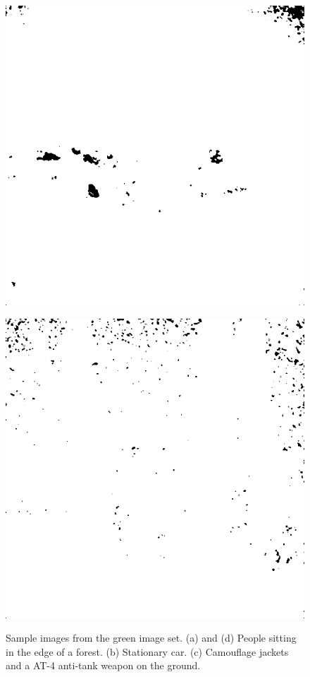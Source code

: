 \begin{figure}[H]
\begin{minipage}[t]{0.245\textwidth}
    \subcaption{}
    \label{fig:good2}
\end{minipage}
\begin{minipage}[t]{0.245\textwidth}
    \includegraphics[width=1\textwidth]{result/SPC_NRQA/g22_512_m30.PNG}
    \subcaption{}
    \label{fig:good3}
\end{minipage}
\begin{minipage}[t]{0.245\textwidth}
    \includegraphics[width = \textwidth]{result/SPC_NRQA/g65_512_m30.PNG}
    \subcaption{}
    \label{fig:good4}
\end{minipage}
    \caption{Sample images from the green image set.
    (a) and (d) People sitting in the edge of a forest.  (b) Stationary car. (c) Camouflage jackets and a AT-4 anti-tank weapon on the ground.}
    \label{fig:good}
\end{figure}

